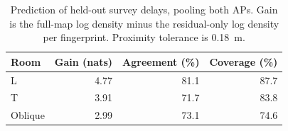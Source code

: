 \begin{table}[t]
\centering
\caption{Prediction of held-out survey delays, pooling both APs. Gain is the full-map log density minus the residual-only log density per fingerprint. Proximity tolerance is 0.18~m.}
\label{tab:surfaces}
\setlength{\tabcolsep}{4pt}
\begin{tabular}{lrrr}
\toprule
Room & Gain (nats) & Agreement (\%) & Coverage (\%)\\
\midrule
L & 4.77 & 81.1 & 87.7\\
T & 3.91 & 71.7 & 83.8\\
Oblique & 2.99 & 73.1 & 74.6\\
\bottomrule
\end{tabular}
\end{table}
